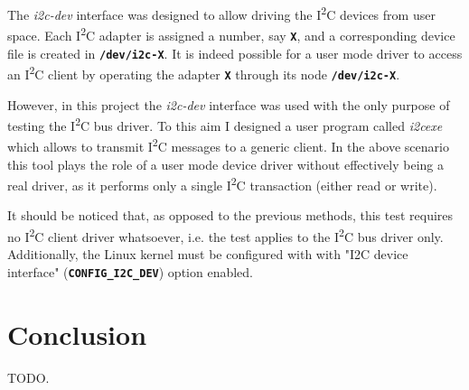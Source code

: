 \documentclass[a4paper,10pt]{article}
\newcommand{\icc}{I\textsuperscript{2}C }
\newcommand{\keyword}[1]{\texttt{\textbf{#1}}}
\begin{document}
\begin{multicols}{2}
The \emph{i2c-dev} interface was designed to allow driving the \icc devices from
user space. Each \icc adapter is assigned a number, say \keyword{X}, and a
corresponding device file is created in \keyword{/dev/i2c-X}.
It is indeed possible for a user mode driver to access an \icc client by
operating the adapter \keyword{X} through its node \keyword{/dev/i2c-X}.

However, in this project the \emph{i2c-dev} interface was used with the only
purpose of testing the \icc bus driver. To this aim I designed a user program
called \emph{i2cexe} which allows to transmit \icc messages to a generic client.
In the above scenario this tool plays the role of a user mode device driver
without effectively being a real driver, as it performs only a single \icc 
transaction (either read or write).

It should be noticed that, as opposed to the previous methods, this test
requires no \icc client driver whatsoever, i.e. the test applies to the \icc bus driver only.
Additionally, the Linux kernel must be configured with with "I2C device interface" (\keyword{CONFIG\_I2C\_DEV}) option enabled.




\section{Conclusion}

TODO.



\nocite{nxp-i2c-spec}
\nocite{linux-kernel-archive}





\end{multicols}
\end{document}

